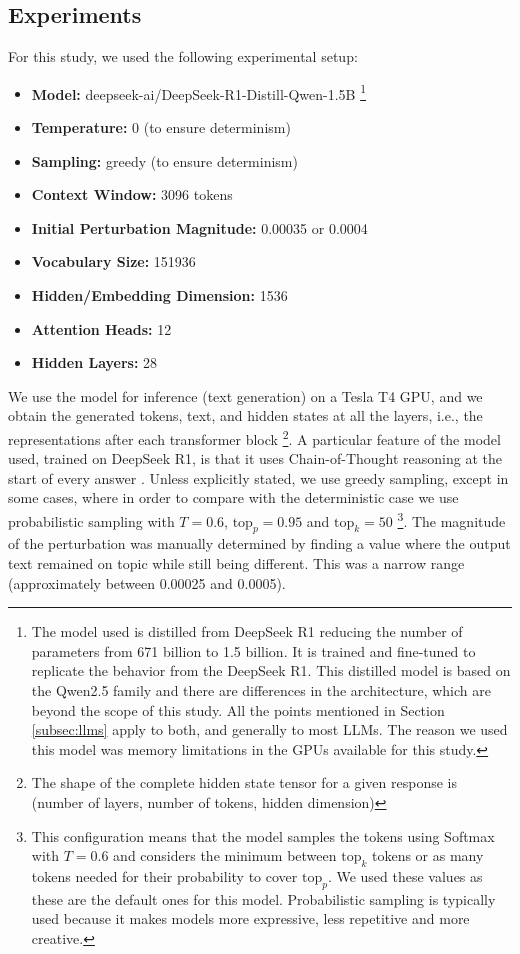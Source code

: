 \documentclass[a4paper,12pt]{article}
\begin{document}
\subsection{Experiments}
\label{subsec:experiments}

For this study, we used the following experimental setup:
\begin{itemize}
    \item \textbf{Model:} deepseek-ai/DeepSeek-R1-Distill-Qwen-1.5B \cite{deepseek2025r1distillqwen1.5b} \footnote{The model used is distilled from DeepSeek R1 reducing the number of parameters from 671 billion to 1.5 billion. It is trained and fine-tuned to replicate the behavior from the DeepSeek R1. This distilled model is based on the Qwen2.5 family and there are differences in the architecture, which are beyond the scope of this study. All the points mentioned in Section \ref{subsec:llms} apply to both, and generally to most LLMs. The reason we used this model was memory limitations in the GPUs available for this study.}
    \item \textbf{Temperature:} 0 (to ensure determinism)
    \item \textbf{Sampling:} greedy (to ensure determinism)
    \item \textbf{Context Window:} 3096 tokens
    \item \textbf{Initial Perturbation Magnitude:} 0.00035 or 0.0004 
    \item \textbf{Vocabulary Size:} 151936
    \item \textbf{Hidden/Embedding Dimension:} 1536
    \item \textbf{Attention Heads:} 12
    \item \textbf{Hidden Layers:} 28
\end{itemize}

We use the model for inference (text generation) on a Tesla T4 GPU, and we obtain the generated tokens, text, and hidden states at all the layers, i.e., the representations after each transformer block \footnote{The shape of the complete hidden state tensor for a given response is (number of layers, number of tokens, hidden dimension)}. A particular feature of the model used, trained on DeepSeek R1, is that it uses Chain-of-Thought reasoning at the start of every answer \cite{deepseekR1}. Unless explicitly stated, we use greedy sampling, except in some cases, where in order to compare with the deterministic case we use probabilistic sampling with $T=0.6$, $\text{top}_p = 0.95$ and $\text{top}_k = 50$ \footnote{This configuration means that the model samples the tokens using Softmax with $T=0.6$ and considers the minimum between $\text{top}_k$ tokens or as many tokens needed for their probability to cover $\text{top}_p$. We used these values as these are the default ones for this model. Probabilistic sampling is typically used because it makes models more expressive, less repetitive and more creative.}.
The magnitude of the perturbation was manually determined by finding a value where the output text remained on topic while still being different. This was a narrow range (approximately between 0.00025 and 0.0005).
\end{document}
